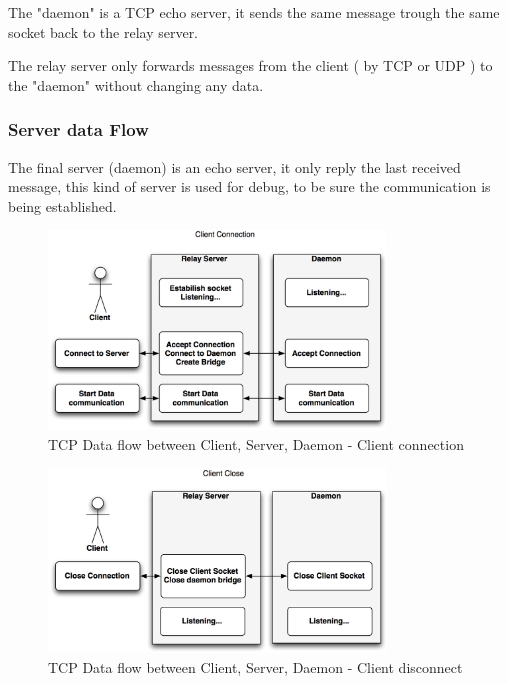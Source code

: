 The "daemon" is a TCP echo server, it sends the same message trough the same socket back to the relay server.

The relay server only forwards messages from the client ( by TCP or UDP ) to the "daemon" without changing any data.

\subsubsection{Server data Flow}

The final server (daemon) is an echo server, it only reply the last received message, this kind of server is used for debug, to be sure the communication is being established. 

\begin{figure}[H]
	\begin{centering}
		 \includegraphics[width=0.8\textwidth,page=2,angle=0]{images/dataflow1.png}
		\caption{TCP Data flow between Client, Server, Daemon - Client connection}
	\end{centering}
\end{figure}

\begin{figure}[H]
	\begin{centering}
		 \includegraphics[width=0.8\textwidth,page=2,angle=0]{images/dataflow2.png}
		\caption{TCP Data flow between Client, Server, Daemon - Client disconnect}
	\end{centering}
\end{figure}

